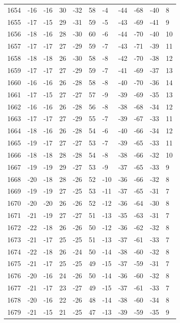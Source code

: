 \begin{table}[H]
\begin{tabular}{lllllllllll}
1654 & -16 & -16 & 30 & -32 & 58 & -4 & -44 & -68 & -40 & 8 \\
1655 & -17 & -15 & 29 & -31 & 59 & -5 & -43 & -69 & -41 & 9 \\
1656 & -18 & -16 & 28 & -30 & 60 & -6 & -44 & -70 & -40 & 10 \\
1657 & -17 & -17 & 27 & -29 & 59 & -7 & -43 & -71 & -39 & 11 \\
1658 & -18 & -18 & 26 & -30 & 58 & -8 & -42 & -70 & -38 & 12 \\
1659 & -17 & -17 & 27 & -29 & 59 & -7 & -41 & -69 & -37 & 13 \\
1660 & -16 & -16 & 26 & -28 & 58 & -8 & -40 & -70 & -36 & 14 \\
1661 & -17 & -15 & 27 & -27 & 57 & -9 & -39 & -69 & -35 & 13 \\
1662 & -16 & -16 & 26 & -28 & 56 & -8 & -38 & -68 & -34 & 12 \\
1663 & -17 & -17 & 27 & -29 & 55 & -7 & -39 & -67 & -33 & 11 \\
1664 & -18 & -16 & 26 & -28 & 54 & -6 & -40 & -66 & -34 & 12 \\
1665 & -19 & -17 & 27 & -27 & 53 & -7 & -39 & -65 & -33 & 11 \\
1666 & -18 & -18 & 28 & -28 & 54 & -8 & -38 & -66 & -32 & 10 \\
1667 & -19 & -19 & 29 & -27 & 53 & -9 & -37 & -65 & -33 & 9 \\
1668 & -20 & -18 & 28 & -26 & 52 & -10 & -36 & -66 & -32 & 8 \\
1669 & -19 & -19 & 27 & -25 & 53 & -11 & -37 & -65 & -31 & 7 \\
1670 & -20 & -20 & 26 & -26 & 52 & -12 & -36 & -64 & -30 & 8 \\
1671 & -21 & -19 & 27 & -27 & 51 & -13 & -35 & -63 & -31 & 7 \\
1672 & -22 & -18 & 26 & -26 & 50 & -12 & -36 & -62 & -32 & 8 \\
1673 & -21 & -17 & 25 & -25 & 51 & -13 & -37 & -61 & -33 & 7 \\
1674 & -22 & -18 & 26 & -24 & 50 & -14 & -38 & -60 & -32 & 8 \\
1675 & -21 & -17 & 25 & -25 & 49 & -15 & -37 & -59 & -31 & 7 \\
1676 & -20 & -16 & 24 & -26 & 50 & -14 & -36 & -60 & -32 & 8 \\
1677 & -21 & -17 & 23 & -27 & 49 & -15 & -37 & -61 & -33 & 7 \\
1678 & -20 & -16 & 22 & -26 & 48 & -14 & -38 & -60 & -34 & 8 \\
1679 & -21 & -15 & 21 & -25 & 47 & -13 & -39 & -59 & -35 & 9 \\

\end{tabular}
\end{table}
